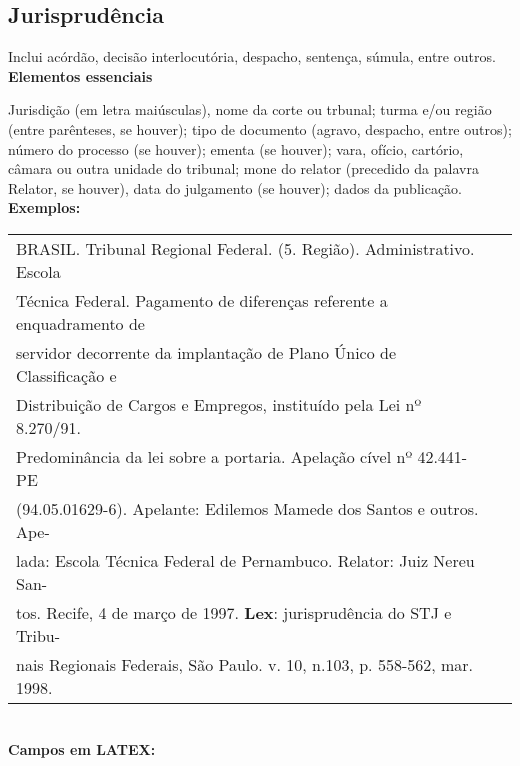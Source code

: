 \subsection{Jurisprud\^encia}

Inclui acórdão, decisão interlocutória, despacho, sentença, súmula, entre outros. \\

\textbf{Elementos essenciais}

Jurisdição (em letra maiúsculas), nome da corte ou trbunal; turma e/ou região (entre par\^enteses, se houver); tipo de documento (agravo, despacho, entre outros); número do processo (se houver); ementa (se houver); vara, ofício, cartório, c\^amara ou outra unidade do tribunal; mone do relator (precedido da palavra Relator, se houver), data do julgamento (se houver); dados da publicação. \\

\textbf{Exemplos:} \\


\begin{tabular}{|l|c|} \hline
	BRASIL. Tribunal Regional Federal. (5. Região). Administrativo. Escola\\
	T\'ecnica Federal. Pagamento de diferenças referente a enquadramento de \\
	servidor decorrente da implantação de Plano Único de Classificação e \\
	Distribuição de Cargos e Empregos, instituído pela Lei nº 8.270/91. \\
	Predomin\^ancia da lei sobre a portaria. Apelação cível nº 42.441-PE \\
	(94.05.01629-6). Apelante: Edilemos Mamede dos Santos e outros. Ape-\\
	lada: Escola T\'ecnica Federal de Pernambuco. Relator: Juiz Nereu San-\\
	tos. Recife, 4 de março de 1997. \textbf{Lex}: jurisprud\^encia do STJ e Tribu-\\
	nais Regionais Federais, São Paulo. v. 10, n.103, p. 558-562, mar. 1998. \\\hline
\end{tabular} \\

\textbf{Campos em LATEX:} 


